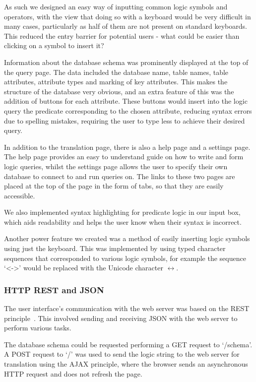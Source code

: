 \documentclass[a4paper, 11pt]{article}
\begin{document}
      As such we designed an easy way of inputting common logic symbols and
      operators, with the view that doing so with a keyboard would be very
      difficult in many cases, particularly as half of them are not present on
      standard keyboards. This reduced the entry barrier for potential users -
      what could be easier than clicking on a symbol to insert it?

      Information about the database schema was prominently displayed at the top
      of the query page. The data included the database name, table names, table
      attributes, attribute types and marking of key attributes. This makes the
      structure of the database very obvious, and an extra feature of this was
      the addition of buttons for each attribute. These buttons would insert
      into the logic query the predicate corresponding to the chosen attribute,
      reducing syntax errors due to spelling mistakes, requiring the user to
      type less to achieve their desired query.

      In addition to the translation page, there is also a help page and a
      settings page. The help page provides an easy to understand guide on how
      to write and form logic queries, whilst the settings page allows the user
      to specify their own database to connect to and run queries on. The links
      to these two pages are placed at the top of the page in the form of tabs,
      so that they are easily accessible.

      We also implemented syntax highlighting for predicate logic in our input
      box, which aids readability and helps the user know when their syntax is
      incorrect.

      Another power feature we created was a method of easily inserting logic
      symbols using just the keyboard. This was implemented by using typed
      character sequences that corresponded to various logic symbols, for
      example the sequence `<->' would be replaced with the Unicode character
      $\leftrightarrow$.

    \subsubsection{HTTP REST and JSON}
      The user interface's communication with the web server was based on the
      REST principle~\cite{rest}. This involved sending and receiving JSON with
      the web server to perform various tasks.

      The database schema could be requested performing a GET request to
      `/schema'. A POST request to `/' was used to send the logic string to the
      web server for translation using the AJAX principle, where the browser
      sends an asynchronous HTTP request and does not refresh the page.
\end{document}
